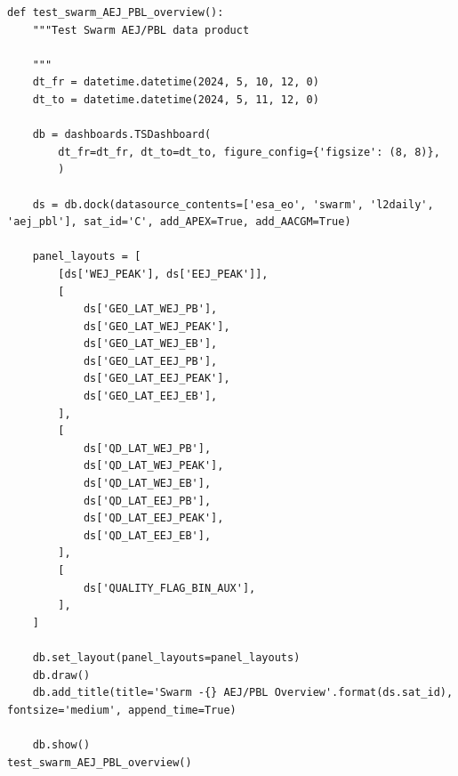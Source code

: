 \begin{verbatim}
def test_swarm_AEJ_PBL_overview():
    """Test Swarm AEJ/PBL data product
    
    """
    dt_fr = datetime.datetime(2024, 5, 10, 12, 0)
    dt_to = datetime.datetime(2024, 5, 11, 12, 0)

    db = dashboards.TSDashboard(
        dt_fr=dt_fr, dt_to=dt_to, figure_config={'figsize': (8, 8)},
        )

    ds = db.dock(datasource_contents=['esa_eo', 'swarm', 'l2daily', 'aej_pbl'], sat_id='C', add_APEX=True, add_AACGM=True)

    panel_layouts = [
        [ds['WEJ_PEAK'], ds['EEJ_PEAK']],
        [
            ds['GEO_LAT_WEJ_PB'],
            ds['GEO_LAT_WEJ_PEAK'], 
            ds['GEO_LAT_WEJ_EB'],
            ds['GEO_LAT_EEJ_PB'],
            ds['GEO_LAT_EEJ_PEAK'],
            ds['GEO_LAT_EEJ_EB'],
        ],
        [
            ds['QD_LAT_WEJ_PB'],
            ds['QD_LAT_WEJ_PEAK'],
            ds['QD_LAT_WEJ_EB'],
            ds['QD_LAT_EEJ_PB'],
            ds['QD_LAT_EEJ_PEAK'],
            ds['QD_LAT_EEJ_EB'],
        ],
        [
            ds['QUALITY_FLAG_BIN_AUX'],
        ],
    ]

    db.set_layout(panel_layouts=panel_layouts)
    db.draw()
    db.add_title(title='Swarm -{} AEJ/PBL Overview'.format(ds.sat_id), fontsize='medium', append_time=True)

    db.show()
test_swarm_AEJ_PBL_overview()
\end{verbatim}

